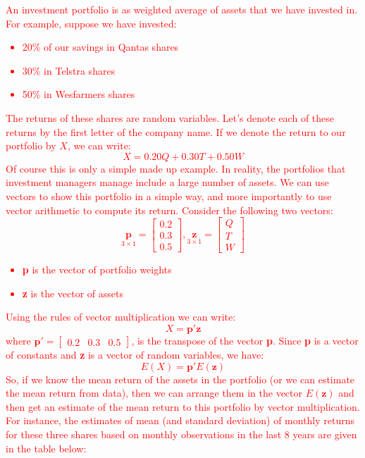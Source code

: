 \documentclass[12pt]{report}
\begin{document}
\noindent \textcolor{red}{An investment portfolio is as weighted average of assets that we have invested in. For example, suppose we have invested:} 
\noindent \textcolor{red}{\begin{itemize}
		\item 20\% of our savings in Qantas shares
		\item 30\% in Telstra shares
		\item 50\% in Wesfarmers shares
\end{itemize}}
\noindent \textcolor{red}{The returns of these shares are random variables. Let's denote each of these returns by the first letter of the company name. If we denote the return to our portfolio by $X$, we can write:$$X = 0.20Q+0.30T+0.50W$$ Of course this is only a simple made up example. In reality, the portfolios that investment managers manage include a large number of assets. We can use vectors to show this portfolio in a simple way, and more importantly to use vector arithmetic to compute its return. Consider the following two vectors:{$$\underset{3\times1}{\textbf{p}}
		=
		\begin{bmatrix}
		0.2 \\
		0.3 \\
		0.5
		\end{bmatrix} , 
		\underset{3\times1}{\textbf{z}}
		=
		\begin{bmatrix}
		Q \\
		T \\
		W
		\end{bmatrix}
		$$}
\begin{itemize}
	\item \textbf{p} is the vector of portfolio weights
	\item \textbf{z} is the vector of assets
\end{itemize} \vspace{-\baselineskip}
Using the rules of vector multiplication we can write: $$X = \textbf{p}'\textbf{z}$$ where $\textbf{p}' = \begin{bmatrix}
0.2 & 0.3 & 0.5
\end{bmatrix}$, is the transpose of the vector \textbf{p}. Since \textbf{p} is a vector of constants and \textbf{z} is a vector of random variables, we have: $$E(X) = \textbf{p}'E(\textbf{z})$$ So, if we know the mean return of the assets in the portfolio (or we can estimate the mean return from data), then we can arrange them in the vector $E(\textbf{z})$ and then get an estimate of the mean return to this portfolio by vector multiplication. For instance, the estimates of mean (and standard deviation) of monthly returns for these three shares based on monthly observations in the last 8 years are given in the table below:}
\end{document}
